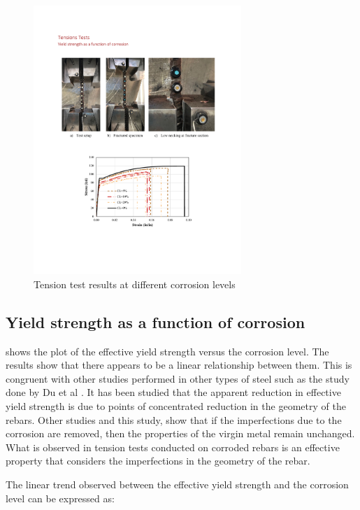 \begin{figure}[htbp]
	\centering
	\includegraphics[width=0.7\textwidth]{VAC Thesis 2.0/Chapter-4/figs/TensionTest_results_1.pdf}
	\caption{Tension test results at different corrosion levels}
	\label{fig:TensionTestResults_StressStrain}
\end{figure}

\subsection{Yield strength as a function of corrosion}
 shows the plot of the effective yield strength versus the corrosion level. The results show that there appears to be a linear relationship between them. This is congruent with other studies performed in other types of steel such as the study done by Du et al \cite{Du2005}. It has been studied that the apparent reduction in effective yield strength is due to points of concentrated reduction in the geometry of the rebars. Other studies \cite{Du2005}\cite{Barcley2018} and this study, show that if the imperfections due to the corrosion are removed, then the properties of the virgin metal remain unchanged. What is observed in tension tests conducted on corroded rebars is an effective property that considers the imperfections in the geometry of the rebar. 

The linear trend observed between the effective yield strength and the corrosion level can be expressed as:

